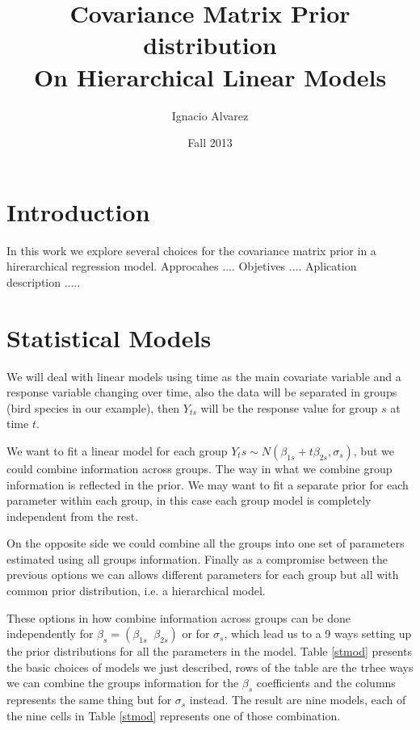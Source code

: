 \documentclass{article}
\title{ Covariance Matrix Prior distribution \\ On Hierarchical Linear Models }
\author{Ignacio Alvarez}
\date{ Fall 2013 }
\begin{document}
\maketitle 

\vspace{3cm}

\section{Introduction} 

In this work we explore several choices for the covariance matrix prior in a hirerarchical regression model. 
Approcahes .... 
Objetives ....
Aplication description .....



\section{Statistical Models} 
We will deal with linear models using time as the main covariate variable and a response variable changing over time, also the data will be separated in groups (bird species in our example), then $Y_{ts}$ will be the response value for group $s$ at time $t$. 

We want to fit a linear model for each group $Y_ts \sim N(\beta_{1s} + t\beta_{2s}, \sigma_s)$, but we could combine information across groups. The way in what we combine group information is reflected in the prior. We may want to fit a separate prior for each parameter within each group, in this case each group model is completely independent from the rest. 

On the opposite side we could combine all the groups into one set of parameters estimated using all groups information. Finally as a compromise between the previous options we can allows different parameters for each group but all with common prior distribution, i.e. a hierarchical model. 

These options in how combine information across groups can be done independently for $\beta_s=(\beta_{1s}\;\;\beta_{2s})$ or for $\sigma_s$, which lead us to a 9 ways setting up the prior distributions for all the parameters in the model. Table \ref{stmod} presents the basic choices of models we just described, rows of the table are the trhee ways we can combine the groups information for the $\beta_s$ coefficients and the columns represents the same thing but for $\sigma_s$ instead. 
The result are nine models, each of the nine cells in Table \ref{stmod} represents one of those combination. 
 
\end{document}
